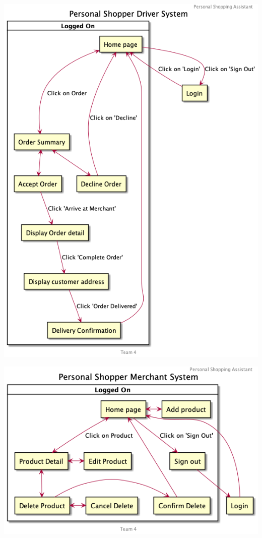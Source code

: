 \begin{center}
    \includegraphics[scale=0.40]{../images/psds.png}
\end{center}
\begin{center}
    \includegraphics[scale=0.40]{../images/psms.png}
\end{center}
